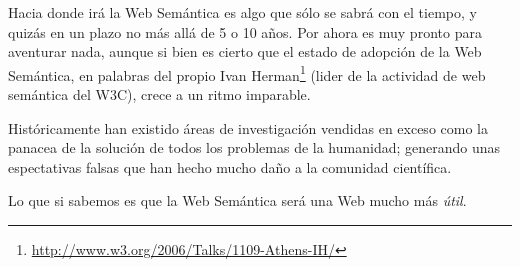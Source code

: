 Hacia donde irá la Web Semántica es algo que sólo se sabrá con el tiempo, y quizás
en un plazo no más allá de 5 o 10 años. Por ahora es muy pronto para aventurar nada,
aunque si bien es cierto que el estado de adopción de la Web Semántica, en palabras
del propio Ivan Herman\footnote{\url{http://www.w3.org/2006/Talks/1109-Athens-IH/}}
(lider de la actividad de web semántica del W3C), crece a un ritmo imparable.

Históricamente han existido áreas de investigación vendidas en exceso como la 
panacea de la solución de todos los problemas de la humanidad; generando unas 
espectativas falsas que han hecho mucho daño a la comunidad científica.

Lo que si sabemos es que la Web Semántica será una Web mucho más \emph{útil}.
